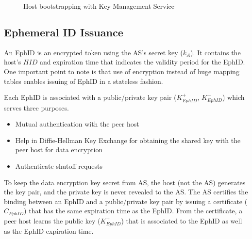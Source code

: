 \begin{figure}[th!!]
\centering
\noindent
\hspace*{1.4cm}
\decoRule
\caption[Host Bootstrapping]{Host bootstrapping with Key Management Service}
\label{fig:host_boot}
\end{figure}

\subsection{Ephemeral ID Issuance}
An EphID is an encrypted token using the AS's secret key ($k_A$). It contains the host's $HID$ and expiration time that indicates the validity period for the EphID. One important point to note is that use of encryption instead of huge mapping tables enables issuing of EphID in a stateless fashion.

Each EphID is associated with a public/private key pair ($K^{+}_{EphID}$, $K^{-}_{EphID}$) which serves three purposes.
\begin{itemize}
    \item Mutual authentication with the peer host
    \item Help in Diffie-Hellman Key Exchange for obtaining the shared key with the peer host for data encryption
    \item Authenticate shutoff requests
\end{itemize}

To keep the data encryption key secret from AS, the host (not the AS) generates the key pair, and the private key is never revealed to the AS. The AS certifies the binding between an EphID and a public/private key pair by issuing a certificate ($C_{EphID}$) that has the same expiration time as the EphID. From the certificate, a peer host learns the public key ($K^{+}_{EphID}$) that is associated to the EphID as well as the EphID expiration time.

